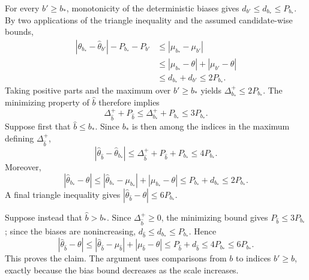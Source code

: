 For every \(b'\ge b_*\), monotonicity of the deterministic biases gives \(d_{b'}\le d_{b_*}\le P_{b_*}\). By two applications of the triangle inequality and the assumed candidate-wise bounds,
\[
\begin{aligned}
|\widehat\theta_{b_*}-\widehat\theta_{b'}|-P_{b_*}-P_{b'}
&\le |\mu_{b_*}-\mu_{b'}|\\
&\le |\mu_{b_*}-\theta|+|\mu_{b'}-\theta|\\
&\le d_{b_*}+d_{b'}\le 2P_{b_*}.
\end{aligned}
\]
Taking positive parts and the maximum over \(b'\ge b_*\) yields \(\Delta_{b_*}^+\le 2P_{b_*}\). The minimizing property of \(\widehat b\) therefore implies
\[
\Delta_{\widehat b}^++P_{\widehat b}
\le \Delta_{b_*}^++P_{b_*}
\le 3P_{b_*}.
\]
Suppose first that \(\widehat b\le b_*\). Since \(b_*\) is then among the indices in the maximum defining \(\Delta_{\widehat b}^+\),
\[
|\widehat\theta_{\widehat b}-\widehat\theta_{b_*}|
\le \Delta_{\widehat b}^++P_{\widehat b}+P_{b_*}
\le 4P_{b_*}.
\]
Moreover,
\[
|\widehat\theta_{b_*}-\theta|
\le |\widehat\theta_{b_*}-\mu_{b_*}|+|\mu_{b_*}-\theta|
\le P_{b_*}+d_{b_*}
\le 2P_{b_*}.
\]
A final triangle inequality gives \(|\widehat\theta_{\widehat b}-\theta|\le 6P_{b_*}\).

Suppose instead that \(\widehat b>b_*\). Since \(\Delta_{\widehat b}^+\ge0\), the minimizing bound gives \(P_{\widehat b}\le3P_{b_*}\); since the biases are nonincreasing, \(d_{\widehat b}\le d_{b_*}\le P_{b_*}\). Hence
\[
|\widehat\theta_{\widehat b}-\theta|
\le |\widehat\theta_{\widehat b}-\mu_{\widehat b}|+|\mu_{\widehat b}-\theta|
\le P_{\widehat b}+d_{\widehat b}
\le 4P_{b_*}
\le 6P_{b_*}.
\]
This proves the claim. The argument uses comparisons from \(b\) to indices \(b'\ge b\), exactly because the bias bound decreases as the scale increases.